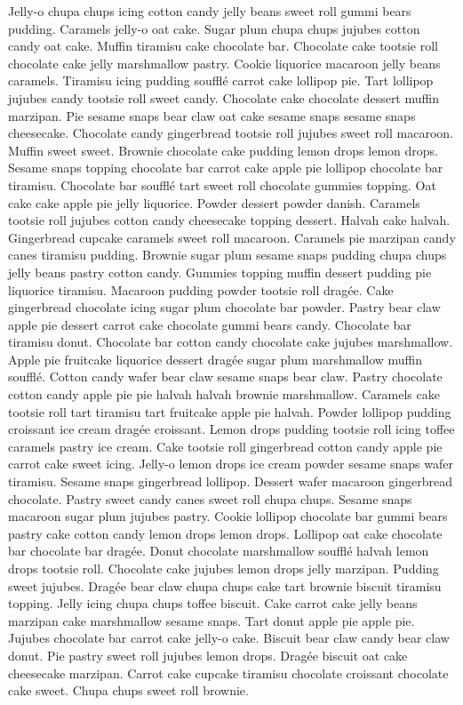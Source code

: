 Jelly-o chupa chups icing cotton candy jelly beans sweet roll gummi bears pudding. Caramels jelly-o oat cake. Sugar plum chupa chups jujubes cotton candy oat cake. Muffin tiramisu cake chocolate bar. Chocolate cake tootsie roll chocolate cake jelly marshmallow pastry. Cookie liquorice macaroon jelly beans caramels. Tiramisu icing pudding soufflé carrot cake lollipop pie. Tart lollipop jujubes candy tootsie roll sweet candy. Chocolate cake chocolate dessert muffin marzipan. Pie sesame snaps bear claw oat cake sesame snaps sesame snaps cheesecake. Chocolate candy gingerbread tootsie roll jujubes sweet roll macaroon. Muffin sweet sweet. Brownie chocolate cake pudding lemon drops lemon drops.
Sesame snaps topping chocolate bar carrot cake apple pie lollipop chocolate bar tiramisu. Chocolate bar soufflé tart sweet roll chocolate gummies topping. Oat cake cake apple pie jelly liquorice. Powder dessert powder danish. Caramels tootsie roll jujubes cotton candy cheesecake topping dessert. Halvah cake halvah. Gingerbread cupcake caramels sweet roll macaroon. Caramels pie marzipan candy canes tiramisu pudding. Brownie sugar plum sesame snaps pudding chupa chups jelly beans pastry cotton candy. Gummies topping muffin dessert pudding pie liquorice tiramisu. Macaroon pudding powder tootsie roll dragée. Cake gingerbread chocolate icing sugar plum chocolate bar powder. Pastry bear claw apple pie dessert carrot cake chocolate gummi bears candy. Chocolate bar tiramisu donut.
Chocolate bar cotton candy chocolate cake jujubes marshmallow. Apple pie fruitcake liquorice dessert dragée sugar plum marshmallow muffin soufflé. Cotton candy wafer bear claw sesame snaps bear claw. Pastry chocolate cotton candy apple pie pie halvah halvah brownie marshmallow. Caramels cake tootsie roll tart tiramisu tart fruitcake apple pie halvah. Powder lollipop pudding croissant ice cream dragée croissant. Lemon drops pudding tootsie roll icing toffee caramels pastry ice cream. Cake tootsie roll gingerbread cotton candy apple pie carrot cake sweet icing. Jelly-o lemon drops ice cream powder sesame snaps wafer tiramisu. Sesame snaps gingerbread lollipop. Dessert wafer macaroon gingerbread chocolate. Pastry sweet candy canes sweet roll chupa chups. Sesame snaps macaroon sugar plum jujubes pastry. Cookie lollipop chocolate bar gummi bears pastry cake cotton candy lemon drops lemon drops.
Lollipop oat cake chocolate bar chocolate bar dragée. Donut chocolate marshmallow soufflé halvah lemon drops tootsie roll. Chocolate cake jujubes lemon drops jelly marzipan. Pudding sweet jujubes. Dragée bear claw chupa chups cake tart brownie biscuit tiramisu topping. Jelly icing chupa chups toffee biscuit. Cake carrot cake jelly beans marzipan cake marshmallow sesame snaps. Tart donut apple pie apple pie. Jujubes chocolate bar carrot cake jelly-o cake. Biscuit bear claw candy bear claw donut. Pie pastry sweet roll jujubes lemon drops. Dragée biscuit oat cake cheesecake marzipan. Carrot cake cupcake tiramisu chocolate croissant chocolate cake sweet. Chupa chups sweet roll brownie.
